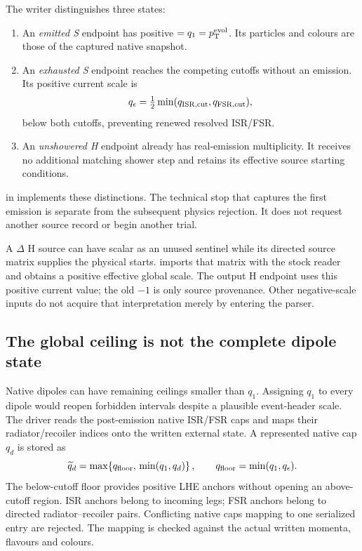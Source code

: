 The writer distinguishes three states:
\begin{enumerate}
\item An \emph{emitted S} endpoint has positive
 $=q_1=p_{\mathrm T}^{\rm evol}$.
Its particles and colours are those of the captured native snapshot.
\item An \emph{exhausted S} endpoint reaches the competing cutoffs
without an emission. Its positive current scale is
\begin{equation}
 q_\epsilon=\tfrac12
       \min(q_{\rm ISR,cut},q_{\rm FSR,cut}),
 \label{eq:masses-exhausted-scale}
\end{equation}
below both cutoffs, preventing renewed resolved ISR/FSR.
\item An \emph{unshowered H} endpoint already has real-emission
multiplicity. It receives no additional matching shower step
and retains its effective source starting conditions.
\end{enumerate}
 in
implements these distinctions.
The technical stop that captures the first emission is separate
from the subsequent physics rejection.
It does not request another source record or begin another trial.

A $\Delta$ H source can have scalar  as an unused
sentinel while its directed source matrix supplies the physical starts.
 imports that matrix with the stock reader and
obtains a positive effective global scale.
The output H endpoint uses this positive current value;
the old $-1$ is only source provenance.
Other negative-scale inputs do not acquire that interpretation
merely by entering the parser.

\subsection{The global ceiling is not the complete dipole state}
\label{sec:masses-dipole-caps}

Native dipoles can have remaining ceilings smaller than $q_1$.
Assigning $q_1$ to every dipole would reopen forbidden intervals
despite a plausible event-header scale.
The driver reads the post-emission native ISR/FSR caps and maps
their radiator/recoiler indices onto the written external state.
A represented native cap $q_d$ is stored as
\begin{equation}
 \widetilde q_d=
 \max\!\left\{q_{\rm floor},\,\min(q_1,q_d)\right\},
 \qquad q_{\rm floor}=\min(q_1,q_\epsilon).
 \label{eq:masses-native-cap}
\end{equation}
The below-cutoff floor provides positive LHE anchors without opening
an above-cutoff region.
ISR anchors belong to incoming legs; FSR anchors belong to directed
radiator--recoiler pairs.
Conflicting native caps mapping to one serialized entry are rejected.
The mapping is checked against the actual written momenta,
flavours and colours.

